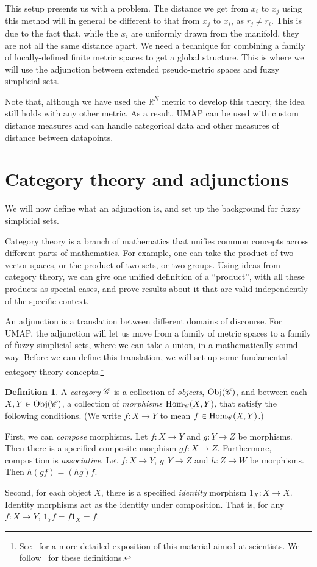 \documentclass[a4paper,11pt,leqno]{article} \usepackage{amsmath}
\newcommand{\RR}{\mathbb{R}} \newcommand{\QQ}{\mathbb{Q}}
\newcommand{\Hom}{\ensuremath{\operatorname{Hom}}}
\newcommand{\Obj}{\ensuremath{\operatorname{Obj}}}
\theoremstyle{definition}
\newtheorem{defn}{Definition}
\begin{document}
This setup presents us with a problem.
The distance we get from $x_i$ to $x_j$ using this method will in general be
different to that from $x_j$ to $x_i$, as $r_j\not= r_i$.
This is due to the fact that, while the $x_i$ are uniformly drawn from the
manifold, they are not all the same distance apart.
We need a technique for combining a family of locally-defined finite metric
spaces to get a global structure.
This is where we will use the adjunction between extended pseudo-metric spaces
and fuzzy simplicial sets.

Note that, although we have used the $\RR^N$ metric to develop this theory, the
idea still holds with any other metric.
As a result, UMAP can be used with custom distance measures and can handle
categorical data and other measures of distance between datapoints.

\section{Category theory and adjunctions}

We will now define what an adjunction is, and set up the background for fuzzy
simplicial sets.

Category theory is a branch of mathematics that unifies common concepts across
different parts of mathematics.
For example, one can take the product of two vector spaces, or the product of
two sets, or two groups.
Using ideas from category theory, we can give one unified definition of a
``product'', with all these products as special cases, and prove results about
it that are valid independently of the specific context.

An adjunction is a translation between different domains of discourse.
For UMAP, the adjunction will let us move from a family of metric spaces to
a family of fuzzy simplicial sets, where we can take a union, in
a mathematically sound way.
Before we can define this translation, we will set up some fundamental category
theory concepts.\footnote{
  See~\cite{Spivak18} for a more detailed exposition of this material aimed at
  scientists.  We follow~\cite{Riehl} for these definitions.
}

\begin{defn}
  A \emph{category} $\mathscr{C}$ is a collection of \emph{objects}, $\Obj(\curC)$,
  and between each $X, Y\in\Obj(\curC)$, a collection of \emph{morphisms}
  $\Hom_{\curC}(X, Y)$, that satisfy the following conditions.
  (We write $f: X\to Y$ to mean $f\in \Hom_{\curC}(X, Y)$.)

  First, we can \emph{compose} morphisms.
  Let $f: X\to Y$ and $g: Y\to Z$ be morphisms.
  Then there is a specified composite morphism $gf: X\to Z$.
  Furthermore, composition is \emph{associative}.
  Let $f: X\to Y$, $g: Y\to Z$ and $h: Z\to W$ be morphisms.
  Then $h(gf) = (hg)f$.

  Second, for each object $X$, there is a specified \emph{identity} morphism
  $1_X: X\to X$.
  Identity morphisms act as the identity under composition.
  That is, for any $f: X\to Y$, $1_Yf = f1_X = f$.
\end{defn}
\end{document}
